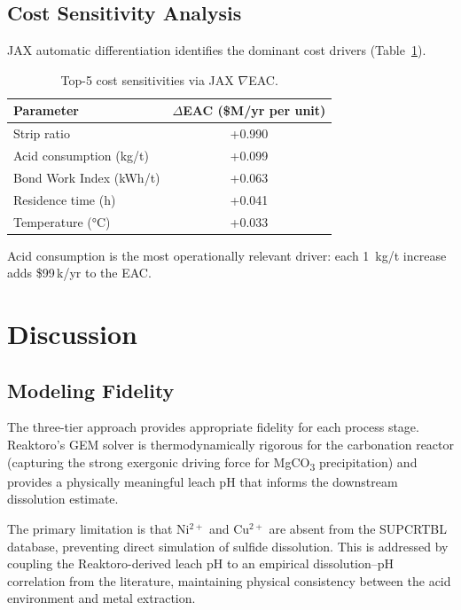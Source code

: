 \documentclass[11pt,a4paper]{article}
\begin{document}
\subsection{Cost Sensitivity Analysis}

JAX automatic differentiation identifies the dominant cost drivers
(Table~\ref{tab:sensitivity}).

\begin{table}[H]
\centering
\caption{Top-5 cost sensitivities via JAX $\nabla$EAC.}
\label{tab:sensitivity}
\begin{tabular}{@{}lc@{}}
\toprule
\textbf{Parameter} & \textbf{$\Delta$EAC (\$M/yr per unit)} \\
\midrule
Strip ratio             & +0.990 \\
Acid consumption (kg/t) & +0.099 \\
Bond Work Index (kWh/t) & +0.063 \\
Residence time (h)      & +0.041 \\
Temperature (\si{\celsius}) & +0.033 \\
\bottomrule
\end{tabular}
\end{table}

Acid consumption is the most operationally relevant driver: each
\SI{1}{kg/t} increase adds \$99\,k/yr to the EAC.

\section{Discussion}
\label{sec:discussion}

\subsection{Modeling Fidelity}

The three-tier approach provides appropriate fidelity for each process
stage.  Reaktoro's GEM solver is thermodynamically rigorous for the
carbonation reactor (capturing the strong exergonic driving force for
MgCO\textsubscript{3} precipitation) and provides a physically
meaningful leach pH that informs the downstream dissolution estimate.

The primary limitation is that Ni$^{2+}$ and Cu$^{2+}$ are absent from
the SUPCRTBL database, preventing direct simulation of sulfide
dissolution.  This is addressed by coupling the Reaktoro-derived leach
pH to an empirical dissolution--pH correlation from the literature,
maintaining physical consistency between the acid environment and metal
extraction.
\end{document}
